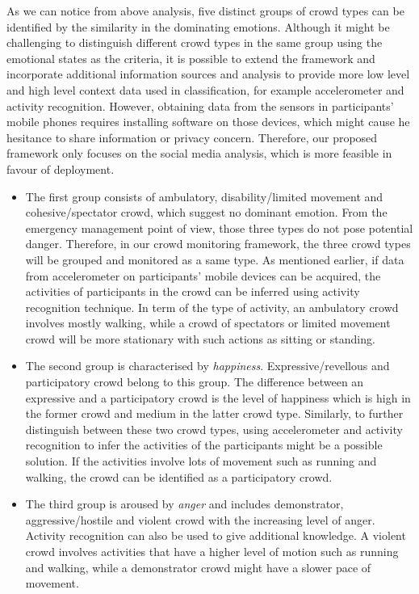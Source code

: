 As we can notice from above analysis, five distinct groups of crowd types can be identified by the similarity in the dominating emotions. Although it might be challenging to distinguish different crowd types in the same group using the emotional states as the criteria, it is possible to extend the framework and incorporate additional information sources and analysis to provide more low level and high level context data used in classification, for example accelerometer and activity recognition. However, obtaining data from the sensors in participants' mobile phones requires installing software on those devices, which might cause he hesitance to share information or privacy concern. Therefore, our proposed framework only focuses on the social media analysis, which is more feasible in favour of deployment.

\begin{itemize}
\item The first group consists of ambulatory, disability/limited movement and cohesive/spectator crowd, which suggest no dominant emotion. From the emergency management point of view, those three types do not pose potential danger. Therefore, in our crowd monitoring framework, the three crowd types will be grouped and monitored as a same type. As mentioned earlier, if data from accelerometer on participants' mobile devices can be acquired, the activities of participants in the crowd can be inferred using activity recognition technique. In term of the type of activity, an ambulatory crowd involves mostly walking, while a crowd of spectators or limited movement crowd will be more stationary with such actions as sitting or standing.

\item The second group is characterised by \textit{happiness}. Expressive/revellous and participatory crowd belong to this group. The difference between an expressive and a participatory crowd is the level of happiness which is high in the former crowd and medium in the latter crowd type. Similarly, to further distinguish between these two crowd types, using accelerometer and activity recognition to infer the activities of the participants might be a possible solution. If the activities involve lots of movement such as running and walking, the crowd can be identified as a participatory crowd.

\item The third group is aroused by \textit{anger} and includes demonstrator, aggressive/hostile and violent crowd with the increasing level of anger. Activity recognition can also be used to give additional knowledge. A violent crowd involves activities that have a higher level of motion such as running and walking, while a demonstrator crowd might have a slower pace of movement.


\end{itemize}
